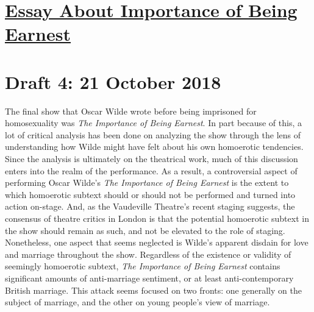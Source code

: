 \documentclass[12pt]{article}[titlepage]
\newcommand{\1}{\={a}}
\newcommand{\2}{\={e}}
\newcommand{\3}{\={\i}}
\newcommand{\4}{\=o}
\newcommand{\5}{\=u}
\newcommand{\6}{\={A}}
\renewcommand{\,}{\textsuperscript{,}}
\begin{document}
\doublespacing
\section{\href{importance-of-being-earnest-essay.html}{Essay About Importance of Being Earnest}}
\section{Draft 4: 21 October 2018}
The final show that Oscar Wilde wrote before being imprisoned for homosexuality was \textit{The Importance of Being Earnest}.
In part because of this, a lot of critical analysis has been done on analyzing the show through the lens of understanding how Wilde might have felt about his own homoerotic tendencies.
Since the analysis is ultimately on the theatrical work, much of this discussion enters into the realm of the performance.
As a result, a controversial aspect of performing Oscar Wilde's \textit{The Importance of Being Earnest} is the extent to which homoerotic subtext should or should not be performed and turned into action on-stage.
And, as the Vaudeville Theatre's recent staging suggests, the consensus of theatre critics in London is that the potential homoerotic subtext in the show should remain as such, and not be elevated to the role of staging.
Nonetheless, one aspect that seems neglected is Wilde's apparent disdain for love and marriage throughout the show.
Regardless of the existence or validity of seemingly homoerotic subtext, \textit{The Importance of Being Earnest} contains significant amounts of anti-marriage sentiment, or at least anti-contemporary British marriage.
This attack seems focused on two fronts: one generally on the subject of marriage, and the other on young people's view of marriage.
\end{document}
